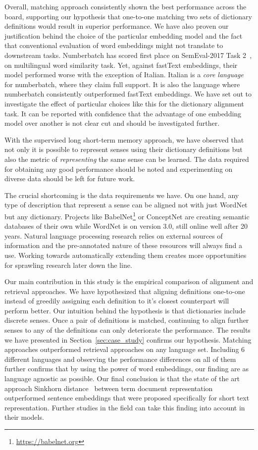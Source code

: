 Overall, matching approach consistently shown the best performance across the board, supporting our hypothesis that one-to-one matching two sets of dictionary definitions would result in superior performance.
We have also proven our justification behind the choice of the particular embedding model and the fact that conventional evaluation of word embeddings might not translate to downstream tasks.
Numberbatch has scored first place on SemEval-2017 Task 2~\cite{camachocollados-EtAl:2017:SemEval}, on multilingual word similarity task.
Yet, against fastText embeddings, their model performed worse with the exception of Italian.
Italian is a \emph{core language} for numberbatch, where they claim full support.
It is also the language where numberbatch consistently outperformed fastText embeddings.
We have set out to investigate the effect of particular choices like this for the dictionary alignment task.
It can be reported with confidence that the advantage of one embedding model over another is not clear cut and should be investigated further.

With the supervised long short-term memory approach, we have observed that not only it is possible to represent senses using their dictionary definitions but also the metric of \emph{representing} the same sense can be learned.
The data required for obtaining any good performance should be noted and experimenting on diverse data should be left for future work.

The crucial shortcoming is the data requirements we have.
On one hand, any type of description that represent a sense can be aligned not with just WordNet but any dictionary.
Projects like BabelNet\footnote{\url{https://babelnet.org}} or ConceptNet are creating semantic databases of their own while WordNet is on version 3.0, still online well after 20 years.
Natural language processing research relies on external sources of information and the pre-annotated nature of these resources will always find a use.
Working towards automatically extending them creates more opportunities for sprawling research later down the line.

Our main contribution in this study is the empirical comparison of alignment and retrieval approaches.
We have hypothesized that aligning definitions one-to-one instead of greedily assigning each definition to it's closest counterpart will perform better.
Our intuition behind the hypothesis is that dictionaries include discrete senses.
Once a pair of definitions is matched, continuing to align further senses to any of the definitions can only deteriorate the performance.
The results we have presented in Section~\ref{sec:case_study} confirms our hypothesis.
Matching approaches outperformed retrieval approaches on any language set.
Including 6 different languages and observing the performance differences on all of them further confirms that by using the power of word embeddings, our finding are as language agnostic as possible.
Our final conclusion is that the state of the art approach Sinkhorn distance~\cite{balikas_cross-lingual_2018} between term document representation outperformed sentence embeddings that were proposed specifically for short text representation.
Further studies in the field can take this finding into account in their models.

